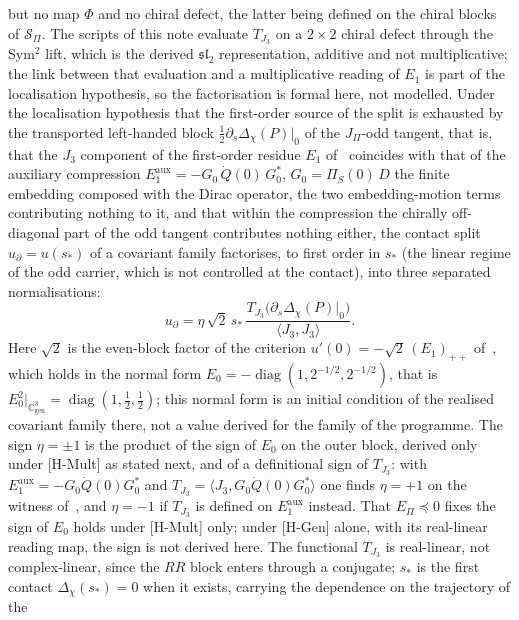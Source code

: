 \documentclass[11pt]{article}
\theoremstyle{definition}
\theoremstyle{remark}
\newcommand{\JPi}{J_{\Pi}}
\newcommand{\Dchi}{\Delta_{\chi}}
\newcommand{\Cgen}{\mathbb{C}^{3}_{\mathrm{gen}}}
\newcommand{\diag}{\operatorname{diag}}
\begin{document}
      but no map $\Phi$ and no chiral defect, the latter being defined on the chiral blocks of $\mathcal S_\Pi$.
      The scripts of this note evaluate $T_{J_3}$ on a $2\times2$ chiral defect through the Sym$^2$ lift, which is the
      derived $\mathfrak{sl}_2$ representation, additive and not multiplicative; the link between that evaluation and a
      multiplicative reading of $E_1$ is part of the localisation hypothesis, so the factorisation is formal here, not
      modelled.
      Under the localisation hypothesis that the first-order source of the split is exhausted by the transported
      left-handed block $\tfrac12 \partial_s \Dchi(P)|_0$ of the $\JPi$-odd tangent, that is, that the $J_3$ component
      of the first-order residue $E_1$ of~\cite{Beau2026ebj} coincides with that of the auxiliary compression
      $E_1^{\mathrm{aux}} = -G_0\,\dot Q(0)\,G_0^{*}$, $G_0 = \Pi_S(0)\,D$ the finite embedding composed with the Dirac
      operator, the two embedding-motion terms contributing nothing to it, and that within the compression the
      chirally off-diagonal part of the odd tangent contributes nothing either, the contact split
      $u_\partial = u(s_*)$ of a covariant family factorises, to first order in $s_*$ (the linear regime of the odd
      carrier, which is not controlled at the contact), into three separated normalisations:
      \[
        u_\partial = \eta\,\sqrt{2}\,s_*\,\frac{T_{J_3}\bigl(\partial_s \Dchi(P)|_0\bigr)}{\langle J_3, J_3\rangle}.
      \]
      Here $\sqrt{2}$ is the even-block factor of the criterion $u'(0)=-\sqrt2\,(E_1)_{++}$ of~\cite{Beau2026ebj},
      which holds in the normal form $E_0=-\diag(1,2^{-1/2},2^{-1/2})$, that is
      $E_0^2|_{\Cgen} = \diag(1, \tfrac12, \tfrac12)$; this normal form is an initial condition of the realised
      covariant family there, not a value derived for the family of the programme.
      The sign $\eta=\pm1$ is the product of the sign of $E_0$ on the outer block, derived only under [H-Mult] as
      stated next, and of a definitional sign of $T_{J_3}$: with $E_1^{\mathrm{aux}}=-G_0\dot Q(0)G_0^{*}$ and
      $T_{J_3}=\langle J_3, G_0\dot Q(0)G_0^{*}\rangle$ one finds $\eta=+1$ on the witness of~\cite{Beau2026ebj}, and
      $\eta=-1$ if $T_{J_3}$ is defined on $E_1^{\mathrm{aux}}$ instead.
      That $E_\Pi\preceq0$ fixes the sign of $E_0$ holds under [H-Mult] only; under [H-Gen] alone, with its real-linear
      reading map, the sign is not derived here.
      The functional $T_{J_3}$ is real-linear, not complex-linear, since the $RR$ block enters through a conjugate;
      $s_*$ is the first contact $\Dchi(s_*) = 0$ when it exists, carrying the dependence on the trajectory of the
\end{document}
